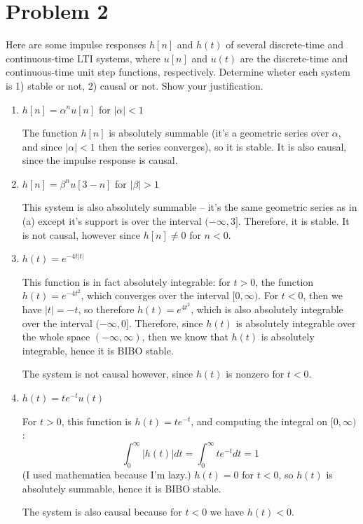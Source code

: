 \documentclass[10pt]{article}
\begin{document}
	\section*{Problem 2}
	Here are some impulse responses \( h[n] \) and \( h(t) \) of several discrete-time and continuous-time LTI systems, 
	where \( u[n] \) and \( u(t) \) are the discrete-time and continuous-time unit step functions, respectively.
	Determine wheter each system is 1) stable or not, 2) causal or not. Show your justification.
	\begin{enumerate}[label=\alph*)]
		\item \( h[n] = \alpha^{n}u[n] \) for \( |\alpha| < 1 \)

			\begin{solution}
				The function \( h[n] \) is absolutely summable (it's a geometric series over \( \alpha \), and since 
				\( |\alpha| < 1 \) then the series converges), so it is stable. It is also causal, since the 
				impulse response is causal. 
			\end{solution}
		\item \( h[n] = \beta^{n} u[3 - n] \) for \( |\beta| > 1 \)

			\begin{solution}
				This system is also absolutely summable -- it's the same geometric series as in (a) except it's 
				support is over the interval \( (-\infty, 3] \). Therefore, it is stable. It is not causal, however
				since \( h[n] \neq 0  \) for  \( n < 0 \). 
			\end{solution}
		\item \( h(t) = e^{-4t|t|} \)

			\begin{solution}
				This function is in fact absolutely integrable: for \( t > 0 \), the function \( h(t) = e^{-4t^2} \), 
				which converges over the interval \( [0, \infty) \). For \( t < 0 \), then we have 
				\( |t| = -t \), so therefore \( h(t) = e^{4t^2} \), which is also absolutely integrable over 
				the interval \( (-\infty, 0] \). Therefore, since \( h(t)  \) is absolutely integrable over 
				the whole space \( (-\infty, \infty) \), then we know that \( h(t) \) is absolutely integrable, 
				hence it is BIBO stable. 

				The system is not causal however, since \( h(t)  \) is nonzero for \( t < 0 \).
			\end{solution}
		\item \( h(t) = te^{-t}u(t) \)

			\begin{solution}
				For \( t > 0 \), this function is \( h(t) = te^{-t} \), 
				and computing the integral on \( [0, \infty) \):
				\[
					\int_{0}^{\infty} |h(t)| dt = \int_{0}^{\infty} te^{-t}dt =1  
				\] 
				(I used mathematica because I'm lazy.) \( h(t) = 0 \) for \( t < 0 \), so \( h(t) \) is 
				absolutely summable, hence it is BIBO stable.

				The system is also causal because for \( t < 0 \) we have \( h(t) < 0 \). 
			\end{solution}
	\end{enumerate}
	\pagebreak
\end{document}
